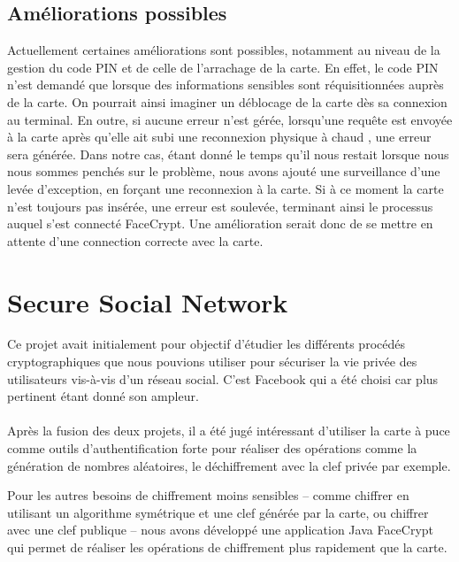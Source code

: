\documentclass[a4paper,11pt,french]{article}
\begin{document}


\subsection{Améliorations possibles}
Actuellement certaines améliorations sont possibles, notamment au niveau
de la gestion du code PIN et de celle de l'arrachage de la carte. En effet,
le code PIN n'est demandé que lorsque des informations sensibles sont
réquisitionnées auprès de la carte. On pourrait ainsi imaginer un déblocage
de la carte dès sa connexion au terminal. En outre, si aucune erreur n'est gérée,
lorsqu'une requête est envoyée à la carte après qu'elle ait subi une reconnexion
physique \og à chaud \fg{}, une erreur sera générée. Dans notre cas, étant donné
le temps qu'il nous restait lorsque nous nous sommes penchés sur le problème, 
nous avons ajouté une surveillance d'une levée d'exception, en forçant une 
reconnexion à la carte. Si à ce moment la carte n'est toujours pas insérée,
une erreur est soulevée, terminant ainsi le processus auquel s'est connecté
FaceCrypt. Une amélioration serait donc de se mettre en attente d'une connection
correcte avec la carte.



\clearpage

\section{Secure Social Network}
Ce projet avait initialement pour objectif d'étudier les différents 
procédés cryptographiques que nous pouvions utiliser pour sécuriser la vie
privée des utilisateurs vis-à-vis d'un réseau social. C'est Facebook qui a 
été choisi car plus pertinent étant donné son ampleur. 

\paragraph{}
Après la fusion des deux projets, il a été jugé intéressant d'utiliser 
la carte à puce comme outils d'authentification forte pour réaliser des 
opérations comme la génération de nombres aléatoires, le déchiffrement 
avec la clef privée par exemple.

Pour les autres besoins de chiffrement moins sensibles -- comme chiffrer
en utilisant un algorithme symétrique et une clef générée par la carte, ou
chiffrer avec une clef publique -- nous avons développé une application
Java \og{}FaceCrypt \fg{} qui permet de réaliser les opérations de chiffrement
plus rapidement que la carte.
\end{document}
